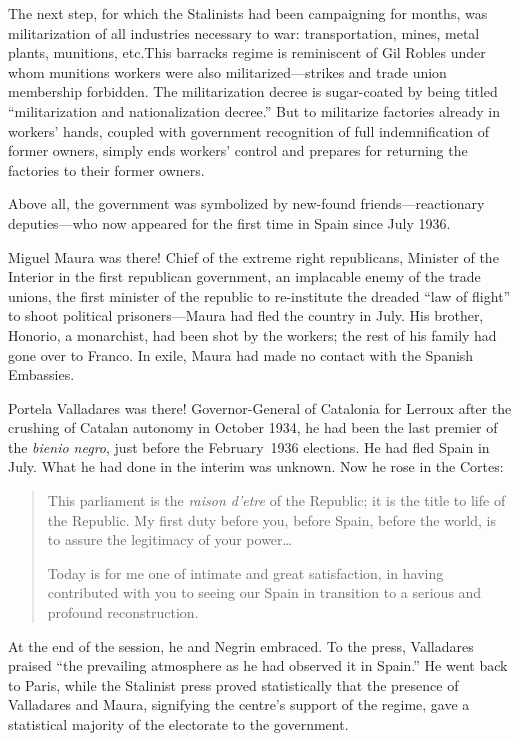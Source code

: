 The next step, for which the Stalinists had been campaigning for months, was militarization of all industries necessary to war: transportation, mines, metal plants, munitions, etc.\@ This barracks regime is reminiscent of Gil Robles under whom munitions workers were also militarized---strikes and trade union membership forbidden. The militarization decree is sugar-coated by being titled ``militarization and nationalization decree.'' But to militarize factories already in workers’ hands, coupled with government recognition of full indemnification of former owners, simply ends workers’ control and prepares for returning the factories to their former owners.

Above all, the government was symbolized by new-found friends---reactionary deputies---who now appeared for the first time in Spain since July 1936.

Miguel Maura was there! Chief of the extreme right republicans, Minister of the Interior in the first republican government, an implacable enemy of the trade unions, the first minister of the republic to re-institute the dreaded ``law of flight'' to shoot political prisoners---Maura had fled the country in July. His brother, Honorio, a monarchist, had been shot by the workers; the rest of his family had gone over to Franco. In exile, Maura had made no contact with the Spanish Embassies.

Portela Valladares was there! Governor-General of Catalonia for Lerroux after the crushing of Catalan autonomy in October 1934, he had been the last premier of the \emph{bienio negro}, just before the February~1936 elections. He had fled Spain in July. What he had done in the interim was unknown. Now he rose in the Cortes:

\begin{quotation}
  This parliament is the \emph{raison d’etre} of the Republic; it is the title to life of the Republic. My first duty before you, before Spain, before the world, is to assure the legitimacy of your power\dots
  
  Today is for me one of intimate and great satisfaction, in having contributed with you to seeing our Spain in transition to a serious and profound reconstruction.
\end{quotation}

At the end of the session, he and Negrin embraced. To the press, Valladares praised ``the prevailing atmosphere as he had observed it in Spain.'' He went back to Paris, while the Stalinist press proved statistically that the presence of Valladares and Maura, signifying the centre’s support of the regime, gave a statistical majority of the electorate to the government.

